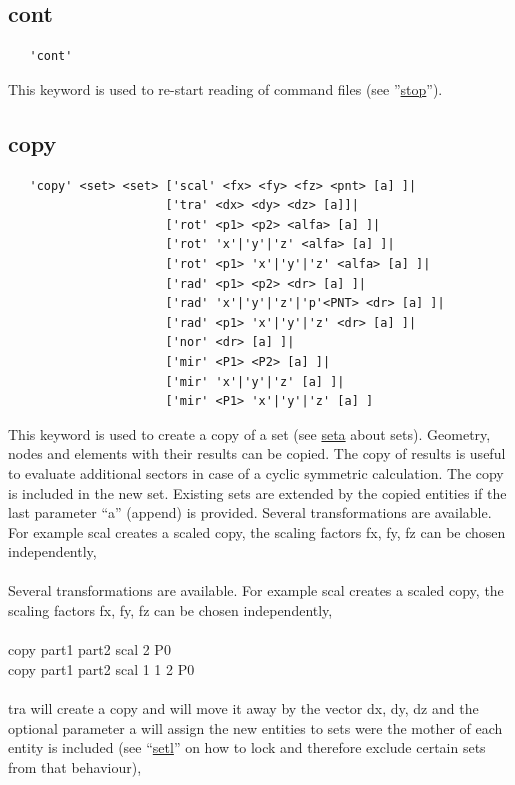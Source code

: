 \documentclass{article}
\providecommand{\htmlref}[2]{\hyperref[#2]{#1}}
\begin{document}
\subsection{\label{cont}cont}
\begin{verbatim}
   'cont'
\end{verbatim}
This keyword is used to re-start reading of command files (see ''\htmlref{stop}{stop}'').

\subsection{\label{copy}copy}
\begin{verbatim}
   'copy' <set> <set> ['scal' <fx> <fy> <fz> <pnt> [a] ]|
                      ['tra' <dx> <dy> <dz> [a]]|
                      ['rot' <p1> <p2> <alfa> [a] ]|
                      ['rot' 'x'|'y'|'z' <alfa> [a] ]|
                      ['rot' <p1> 'x'|'y'|'z' <alfa> [a] ]|
                      ['rad' <p1> <p2> <dr> [a] ]|
                      ['rad' 'x'|'y'|'z'|'p'<PNT> <dr> [a] ]|
                      ['rad' <p1> 'x'|'y'|'z' <dr> [a] ]|
                      ['nor' <dr> [a] ]|
                      ['mir' <P1> <P2> [a] ]| 
                      ['mir' 'x'|'y'|'z' [a] ]| 
                      ['mir' <P1> 'x'|'y'|'z' [a] ] 
\end{verbatim}
This keyword is used to create a copy of a set (see \htmlref{seta}{seta} about sets). Geometry, nodes and elements with their results can be copied. The copy of results is useful to evaluate additional sectors in case of a cyclic symmetric calculation. The copy is included in the new set. Existing sets are extended by the copied entities if the last parameter ``a'' (append) is provided. Several transformations are available. For example scal creates a scaled copy, the scaling factors fx, fy, fz can be chosen independently,\\\\
Several transformations are available. For example scal creates a scaled copy, the scaling factors fx, fy, fz can be chosen independently,\\\\
copy part1 part2 scal 2 P0 \\
copy part1 part2 scal 1 1 2 P0\\\\
tra will create a copy and will move it away by the vector dx, dy, dz and the optional parameter a will assign the new entities to sets were the mother of each entity is included (see ``\htmlref{setl}{setl}'' on how to lock and therefore exclude certain sets from that behaviour),\\\\
\end{document}
